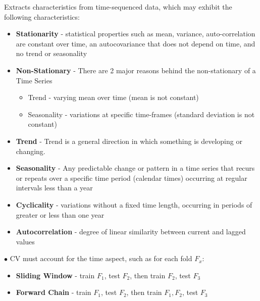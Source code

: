 \documentclass[letterpaper, 10.5pt,landscape]{article}
\begin{document}
\begin{multicols*}{3}
Extracts characteristics from time-sequenced data, which may exhibit the following characteristics:
\begin{itemize}[label={--},leftmargin=4mm]
\vspace{-3pt}
\item \textbf{Stationarity} - statistical properties such as mean, variance, auto-correlation are constant over time, an autocovariance that does not depend on time, and no trend or seasonality
\vspace{-3pt}
\item \textbf{Non-Stationary} - There are 2 major reasons behind the non-stationary of a Time Series 
\vspace{-3pt}
    \begin{itemize}
        \vspace{-3pt}
        \item Trend - varying mean over time (mean is not constant)
        \vspace{-3pt}
        \item Seasonality - variations at specific time-frames (standard deviation is not constant)
    \end{itemize}
    
\item \textbf{Trend} - Trend is a general direction in which something is developing or changing.
\vspace{-3pt}
\item \textbf{Seasonality} - Any predictable change or pattern in a time series that recurs or repeats over a specific time period (calendar times) occurring at regular intervals less than a year
\vspace{-3pt}
\item \textbf{Cyclicality} - variations without a fixed time length, occurring in periods of greater or less than one year
\vspace{-3pt}
\item \textbf{Autocorrelation} - degree of linear similarity between current and lagged values
\end{itemize}


$\bullet$ CV must account for the time aspect, such as for each fold $F_x$:
\begin{itemize}[label={--},leftmargin=4mm]
\vspace{-3pt}
\item \textbf{Sliding Window} - train $F_1$, test $F_2$, then train $F_2$, test $F_3$
\vspace{-3pt}
\item \textbf{Forward Chain} - train $F_1$, test $F_2$, then train $F_1, F_2$, test $F_3$
\end{itemize}


\end{multicols*}
\end{document}
